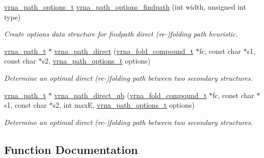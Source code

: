 \begin{DoxyCompactItemize}
\mbox{\hyperlink{group__paths_gaa99d8ec48f64de53eda0d51b1ed0d3d1}{vrna\+\_\+path\+\_\+options\+\_\+t}} \mbox{\hyperlink{group__paths__direct_ga3790a24ca64d68acfa6e67b525151a5f}{vrna\+\_\+path\+\_\+options\+\_\+findpath}} (int width, unsigned int type)
\begin{DoxyCompactList}\small\item\em Create options data structure for findpath direct (re-\/)folding path heuristic. \end{DoxyCompactList}\item 
\mbox{\hyperlink{group__paths_ga818d4f3d1cf8723d6905990b08d909fe}{vrna\+\_\+path\+\_\+t}} $\ast$ \mbox{\hyperlink{group__paths__direct_gacba096caf9a6fe134f33a5afcf2248d8}{vrna\+\_\+path\+\_\+direct}} (\mbox{\hyperlink{group__fold__compound_ga1b0cef17fd40466cef5968eaeeff6166}{vrna\+\_\+fold\+\_\+compound\+\_\+t}} $\ast$fc, const char $\ast$s1, const char $\ast$s2, \mbox{\hyperlink{group__paths_gaa99d8ec48f64de53eda0d51b1ed0d3d1}{vrna\+\_\+path\+\_\+options\+\_\+t}} options)
\begin{DoxyCompactList}\small\item\em Determine an optimal direct (re-\/)folding path between two secondary structures. \end{DoxyCompactList}\item 
\mbox{\hyperlink{group__paths_ga818d4f3d1cf8723d6905990b08d909fe}{vrna\+\_\+path\+\_\+t}} $\ast$ \mbox{\hyperlink{group__paths__direct_ga51d9edaeb42d1d178ea8ba46ccd4c8c0}{vrna\+\_\+path\+\_\+direct\+\_\+ub}} (\mbox{\hyperlink{group__fold__compound_ga1b0cef17fd40466cef5968eaeeff6166}{vrna\+\_\+fold\+\_\+compound\+\_\+t}} $\ast$fc, const char $\ast$s1, const char $\ast$s2, int maxE, \mbox{\hyperlink{group__paths_gaa99d8ec48f64de53eda0d51b1ed0d3d1}{vrna\+\_\+path\+\_\+options\+\_\+t}} options)
\begin{DoxyCompactList}\small\item\em Determine an optimal direct (re-\/)folding path between two secondary structures. \end{DoxyCompactList}\end{DoxyCompactItemize}


\subsection{Function Documentation}
\mbox{\label{group__paths__direct_gad77dbfa125158f534147c0015a849bc3}} 
